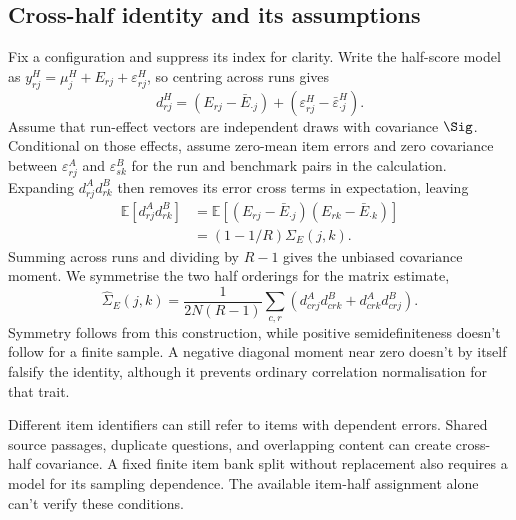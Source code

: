\subsection{Cross-half identity and its assumptions}
Fix a configuration and suppress its index for clarity. Write the half-score model as $y^H_{rj}=\mu^H_j+E_{rj}+\varepsilon^H_{rj}$, so centring across runs gives
\begin{equation}
d^H_{rj}=(E_{rj}-\bar E_{\cdot j})+(\varepsilon^H_{rj}-\bar\varepsilon^H_{\cdot j}).
\end{equation}
Assume that run-effect vectors are independent draws with covariance $\Sig$. Conditional on those effects, assume zero-mean item errors and zero covariance between $\varepsilon^A_{rj}$ and $\varepsilon^B_{sk}$ for the run and benchmark pairs in the calculation. Expanding $d^A_{rj}d^B_{rk}$ then removes its error cross terms in expectation, leaving
\begin{align}
\mathbb E[d^A_{rj}d^B_{rk}]
&=\mathbb E[(E_{rj}-\bar E_{\cdot j})(E_{rk}-\bar E_{\cdot k})]\\
&=(1-1/R)\Sigma_E(j,k).
\end{align}
Summing across runs and dividing by $R-1$ gives the unbiased covariance moment. We symmetrise the two half orderings for the matrix estimate,
\begin{equation}
\widehat\Sigma_E(j,k)=\frac{1}{2N(R-1)}\sum_{c,r}
\left(d^A_{crj}d^B_{crk}+d^A_{crk}d^B_{crj}\right).
\end{equation}
Symmetry follows from this construction, while positive semidefiniteness doesn't follow for a finite sample. A negative diagonal moment near zero doesn't by itself falsify the identity, although it prevents ordinary correlation normalisation for that trait.

Different item identifiers can still refer to items with dependent errors. Shared source passages, duplicate questions, and overlapping content can create cross-half covariance. A fixed finite item bank split without replacement also requires a model for its sampling dependence. The available item-half assignment alone can't verify these conditions.

